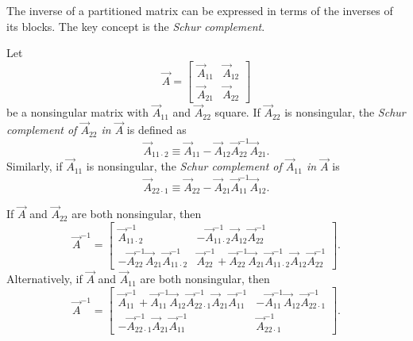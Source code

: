 The inverse of a partitioned matrix can be expressed in terms of the
inverses of its blocks.  The key concept is the \emph{Schur complement}.

\begin{definition}
\label{def:schur}
Let
\[
  \vec{A} =
  \begin{bmatrix}
    \vec{A}_{11} & \vec{A}_{12} \\
    \vec{A}_{21} & \vec{A}_{22}
  \end{bmatrix}
\]
be a nonsingular matrix with $\vec{A}_{11}$ and $\vec{A}_{22}$ square.
If $\vec{A}_{22}$ is nonsingular, the \emph{Schur complement of
$\vec{A}_{22}$ in $\vec{A}$} is defined as
\begin{equation}
  \vec{A}_{11 \cdot 2}
  \equiv \vec{A}_{11} - \vec{A}_{12}\vec{A}_{22}^{-1}\vec{A}_{21}.
  \label{eq:A.6}
\end{equation}
Similarly, if $\vec{A}_{11}$ is nonsingular, the \emph{Schur complement
of $\vec{A}_{11}$ in $\vec{A}$} is
\begin{equation}
  \vec{A}_{22 \cdot 1}
  \equiv \vec{A}_{22} - \vec{A}_{21}\vec{A}_{11}^{-1}\vec{A}_{12}.
  \label{eq:A.7}
\end{equation}
\end{definition}

\begin{proposition}
\label{prop:partitioned-inverse}
If $\vec{A}$ and $\vec{A}_{22}$ are both nonsingular, then
\begin{equation}
  \vec{A}^{-1} =
  \begin{bmatrix}
    \vec{A}_{11 \cdot 2}^{-1} &
      -\vec{A}_{11 \cdot 2}^{-1}\vec{A}_{12}\vec{A}_{22}^{-1} \\[4pt]
    -\vec{A}_{22}^{-1}\vec{A}_{21}\vec{A}_{11 \cdot 2}^{-1} &
      \vec{A}_{22}^{-1} + \vec{A}_{22}^{-1}\vec{A}_{21}
        \vec{A}_{11 \cdot 2}^{-1}\vec{A}_{12}\vec{A}_{22}^{-1}
  \end{bmatrix}.
  \label{eq:A.8}
\end{equation}
Alternatively, if $\vec{A}$ and $\vec{A}_{11}$ are both nonsingular, then
\begin{equation}
  \vec{A}^{-1} =
  \begin{bmatrix}
    \vec{A}_{11}^{-1} + \vec{A}_{11}^{-1}\vec{A}_{12}
      \vec{A}_{22 \cdot 1}^{-1}\vec{A}_{21}\vec{A}_{11}^{-1} &
      -\vec{A}_{11}^{-1}\vec{A}_{12}\vec{A}_{22 \cdot 1}^{-1} \\[4pt]
    -\vec{A}_{22 \cdot 1}^{-1}\vec{A}_{21}\vec{A}_{11}^{-1} &
      \vec{A}_{22 \cdot 1}^{-1}
  \end{bmatrix}.
  \label{eq:A.9}
\end{equation}
\end{proposition}

